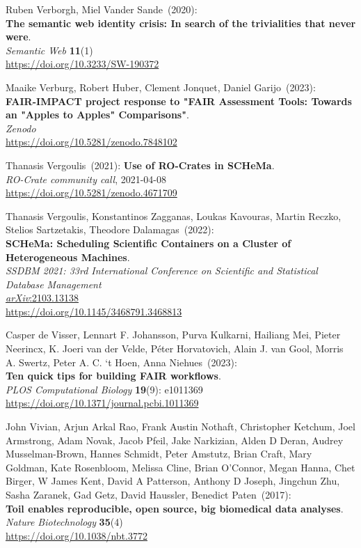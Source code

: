 \begin{thebibliography}{9}
Ruben Verborgh, Miel Vander Sande~(2020): \\
\textbf{The semantic web identity crisis: In search of the trivialities that never were}.\\
\emph{Semantic Web} \textbf{11}(1)\\
\url{https://doi.org/10.3233/SW-190372}

Maaike Verburg, Robert Huber, Clement Jonquet, Daniel Garijo~(2023): \\
\textbf{{FAIR-IMPACT project response to "FAIR Assessment Tools: Towards an "Apples to Apples" Comparisons"}}.\\
\emph{Zenodo}\\
\url{https://doi.org/10.5281/zenodo.7848102}

Thanasis Vergoulis~(2021):   \textbf{Use of RO-Crates in SCHeMa}.\\
\emph{RO-Crate community call}, 2021-04-08\\
\url{https://doi.org/10.5281/zenodo.4671709}

Thanasis Vergoulis, Konstantinos Zagganas, Loukas Kavouras, Martin Reczko, Stelios Sartzetakis, Theodore Dalamagas~(2022): \\
\textbf{SCHeMa: Scheduling Scientific Containers on a Cluster of Heterogeneous Machines}.\\
\emph{SSDBM 2021: 33rd International Conference on Scientific and Statistical Database Management}\\
\href{https://doi.org/10.48550/arXiv.2103.13138}{\emph{arXiv}:2103.13138}\\
\url{https://doi.org/10.1145/3468791.3468813}

Casper de Visser, Lennart F. Johansson, Purva Kulkarni, Hailiang Mei, Pieter Neerincx, K. Joeri van der Velde, Péter Horvatovich, Alain J. van Gool, Morris A. Swertz, Peter A. C. ‘t Hoen, Anna Niehues~(2023):\\
\textbf{Ten quick tips for building FAIR workflows}.\\
\emph{PLOS Computational Biology} \textbf{19}(9): e1011369\\
\url{https://doi.org/10.1371/journal.pcbi.1011369}

John Vivian, Arjun Arkal Rao, Frank Austin Nothaft, Christopher Ketchum, Joel Armstrong, Adam Novak, Jacob Pfeil, Jake Narkizian, Alden D Deran, Audrey Musselman-Brown, Hannes Schmidt, Peter Amstutz, Brian Craft, Mary Goldman, Kate Rosenbloom, Melissa Cline, Brian O'Connor, Megan Hanna, Chet Birger, W James Kent, David A Patterson, Anthony D Joseph, Jingchun Zhu, Sasha Zaranek, Gad Getz, David Haussler, Benedict Paten~(2017): \\
\textbf{Toil enables reproducible, open source, big biomedical data analyses}.\\
\emph{Nature Biotechnology} \textbf{35}(4)\\
\url{https://doi.org/10.1038/nbt.3772}


\end{thebibliography}
